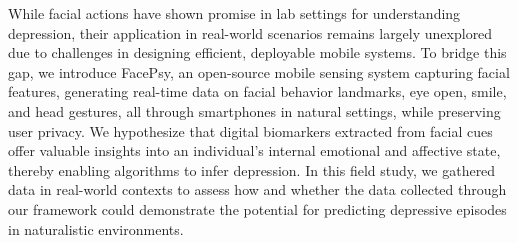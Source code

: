 While facial actions have shown promise in lab settings for understanding depression, their application in real-world scenarios remains largely unexplored due to challenges in designing efficient, deployable mobile systems. To bridge this gap, we introduce FacePsy, an open-source mobile sensing system capturing facial features, generating real-time data on facial behavior landmarks, eye open, smile, and head gestures, all through smartphones in natural settings, while preserving user privacy. We hypothesize that digital biomarkers extracted from facial cues offer valuable insights into an individual's internal emotional and affective state, thereby enabling algorithms to infer depression. In this field study, we gathered data in real-world contexts to assess how and whether the data collected through our framework could demonstrate the potential for predicting depressive episodes in naturalistic environments.


